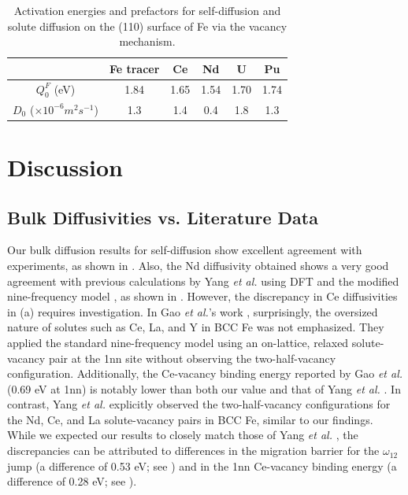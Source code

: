 \documentclass[preprint,12pt]{elsarticle}
\begin{document}
\begin{table}[!ht]
    \centering
    \caption{Activation energies and prefactors for self-diffusion and solute diffusion on the (110) surface of Fe via the vacancy mechanism.}
    \begin{tabular}{|c|c|c|c|c|c|}
    \hline
                & Fe tracer & Ce    & Nd    & U     & Pu \\
    \hline
    $Q_0^F$ (eV)& 1.84      & 1.65  &  1.54 & 1.70  & 1.74\\
    $D_0$ ($\times 10^{-6} m^2s^{-1}$)
                & 1.3       & 1.4   & 0.4   & 1.8   & 1.3\\
    \hline
    \end{tabular}
    \label{tab:surface_activation_energies}
\end{table}

\FloatBarrier
\section{Discussion}

\subsection{Bulk Diffusivities vs. Literature Data}
\label{sec:discussion1}
\noindent Our bulk diffusion results for self-diffusion show excellent agreement with experiments, as shown in . Also, the Nd diffusivity obtained shows a very good agreement with previous calculations by Yang \textit{et al.} \cite{yang_significant_2023} using DFT and the modified nine-frequency model \cite{bocquet_migration_2017}, as shown in . However, the discrepancy in Ce diffusivities in (a) requires investigation.
In Gao \textit{et al.}'s work \cite{GAO2016316}, surprisingly, the oversized nature of solutes such as Ce, La, and Y in BCC Fe was not emphasized. They applied the standard nine-frequency model \cite{leclaire1970} using an on-lattice, relaxed solute-vacancy pair at the 1nn site without observing the two-half-vacancy configuration. Additionally, the Ce-vacancy binding energy reported by Gao \textit{et al.} (0.69 eV at 1nn) is notably lower than both our value and that of Yang \textit{et al.} \cite{yang_significant_2023}.
In contrast, Yang \textit{et al.} \cite{yang_significant_2023} explicitly observed the two-half-vacancy configurations for the Nd, Ce, and La solute-vacancy pairs in BCC Fe, similar to our findings. While we expected our results to closely match those of Yang \textit{et al.} \cite{yang_significant_2023}, the discrepancies can be attributed to differences in the migration barrier for the $\omega_{12}$ jump (a difference of 0.53 eV; see ) and in the 1nn Ce-vacancy binding energy (a difference of 0.28 eV; see ).
\end{document}
